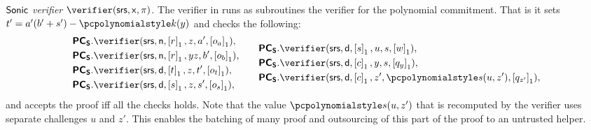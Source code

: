 \documentclass[runningheads,11pt]{llncs}
\newcommand{\ourpar}[1] {\smallskip\noindent\emph{#1}}
\begin{document}
\ourpar{${\textnormal{\textsf{Sonic}}}$ verifier $\verifier(\srs, \inp, \zkproof)$.} The verifier
in \sonic{} runs as subroutines the verifier for the polynomial commitment. That
is it sets $t' = a'(b' + s') - \p{k}(y)$ and checks the following:
\begin{equation*}
  \begin{split}
    &\PCOMs.\verifier(\srs, \multconstr, \gone{r}, z, a', \gone{o_a}), \\
    &\PCOMs.\verifier(\srs, \multconstr, \gone{r}, yz, b', \gone{o_b}),\\
    &\PCOMs.\verifier(\srs, \dconst, \gone{t}, z, t', \gone{o_t}),\\
    &\PCOMs.\verifier(\srs, \dconst, \gone{s}, z, s', \gone{o_s}),\\
  \end{split}
  \qquad
  \begin{split}
    &\PCOMs.\verifier(\srs, \dconst, \gone{s}, u, s, \gone{w}),\\
    &\PCOMs.\verifier(\srs, \dconst, \gone{c}, y, s, \gone{q_y}),\\
    &\PCOMs.\verifier(\srs, \dconst, \gone{c}, z', \p{s}(u, z'), \gone{q_{z'}}),
  \end{split}
\end{equation*}
and accepts the proof iff all the checks holds. Note that the value
$\p{s}(u, z')$ that is recomputed by the verifier uses separate challenges $u$
and $z'$. This enables the batching of many proof and outsourcing of this
part of the proof to an untrusted helper.
\end{document}
